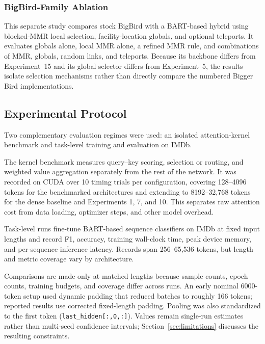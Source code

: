\documentclass[11pt]{article}
\begin{document}
\subsubsection*{BigBird-Family Ablation}
\label{exp:bigbird-family}
This separate study compares stock BigBird \citep{zaheer2020bigbird} with a
BART-based hybrid using blocked-MMR local selection, facility-location
globals, and optional teleports. It evaluates globals alone, local MMR alone,
a refined MMR rule, and combinations of MMR, globals, random links, and
teleports. Because its backbone differs from Experiment~15 and its global
selector differs from Experiment~5, the results isolate selection mechanisms
rather than directly compare the numbered Bigger Bird implementations.

\subsection{Experimental Protocol}
\label{sec:protocol}

Two complementary evaluation regimes were used: an isolated attention-kernel
benchmark and task-level training and evaluation on IMDb.

The kernel benchmark measures query--key scoring, selection or routing, and
weighted value aggregation separately from the rest of the network. It was
recorded on CUDA over 10 timing trials per configuration, covering 128--4096
tokens for the benchmarked architectures and extending to 8192--32{,}768
tokens for the dense baseline and Experiments 1, 7, and 10. This separates
raw attention cost from data loading, optimizer steps, and other model
overhead.

Task-level runs fine-tune BART-based sequence classifiers
\citep{lewis2020bart} on IMDb at fixed input lengths and record F1, accuracy,
training wall-clock time, peak device memory, and per-sequence inference
latency. Records span 256--65{,}536 tokens, but length and metric coverage
vary by architecture.

Comparisons are made only at matched lengths because sample counts, epoch
counts, training budgets, and coverage differ across runs. An early nominal
6000-token setup used dynamic padding that reduced batches to roughly 166
tokens; reported results use corrected fixed-length padding. Pooling was also
standardized to the first token
(\texttt{last\_hidden[:,0,:]}). Values remain single-run estimates rather
than multi-seed confidence intervals; Section~\ref{sec:limitations} discusses
the resulting constraints.
\end{document}
